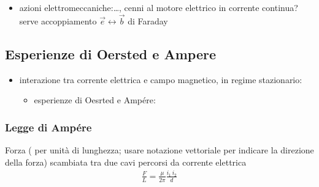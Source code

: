 \documentclass[letterpaper,10pt,italian]{jupyterBook}
\begin{document}
\sphinxAtStartPar
{} 
\begin{itemize}
\item {} 
\sphinxAtStartPar
azioni elettro\sphinxhyphen{}meccaniche:…, cenni al motore elettrico in corrente continua? serve accoppiamento \(\vec{e} \leftrightarrow \vec{b}\) di Faraday

\end{itemize}


\subsection{Esperienze di Oersted e Ampere}
\label{\detokenize{ch/electromagnetism/electromagnetism-steady:esperienze-di-oersted-e-ampere}}\begin{itemize}
\item {} 
\sphinxAtStartPar
interazione tra corrente elettrica e campo magnetico, in regime stazionario:
\begin{itemize}
\item {} 
\sphinxAtStartPar
esperienze di Oesrted e Ampére:

\end{itemize}

\end{itemize}


\subsubsection{Legge di Ampére}
\label{\detokenize{ch/electromagnetism/electromagnetism-steady:legge-di-ampere}}
\sphinxAtStartPar
Forza ( per unità di lunghezza; usare notazione vettoriale per indicare la direzione della forza) scambiata tra due cavi percorsi da corrente elettrica
\begin{equation*}
\begin{split}\frac{F}{L} = \frac{\mu}{2 \pi} \frac{i_1 \, i_2}{d}\end{split}
\end{equation*}
\end{document}
